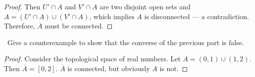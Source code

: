 \documentclass[12pt, a4paper]{amsart}
\newcommand{\turnin}{\faPencilSquareO}
\begin{document}
\begin{compactenum}[(a)]
\begin{proof}
\noindent Then $U' \cap A$ and $V' \cap A$ are two disjoint open sets and 
$A = (U' \cap A) \cup (V' \cap A)$, which implies $A$ is disconnected --- 
a contradiction. Therefore, $\overline{A}$ must be connected.
\end{proof}

\item \turnin\ Give a counterexample to show that the converse of the previous part is false.

\begin{proof}
Consider the topological space of real numbers. 
Let $A = (0,1)\cup (1,2)$. Then $\overline{A} = [0,2]$. 
$\overline{A}$ is connected, but obviously $A$ is not.
\end{proof}

\end{compactenum}
\end{document}
